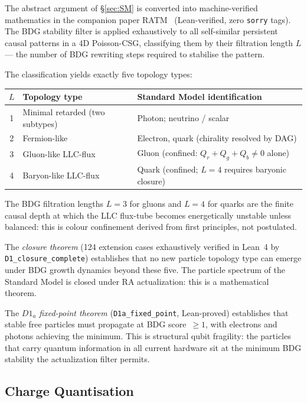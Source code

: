 \documentclass[11pt,a4paper]{article}
\begin{document}
The abstract argument of \S\ref{sec:SM} is converted into machine-verified
mathematics in the companion paper RATM~\citep{Sandeman2026RATM}
(Lean-verified, zero \texttt{sorry} tags). The BDG stability
filter is applied exhaustively to all self-similar persistent causal
patterns in a 4D Poisson-CSG, classifying them by their filtration length
$L$ --- the number of BDG rewriting steps required to stabilise the pattern.

The classification yields exactly five topology types:

\begin{center}
\renewcommand{\arraystretch}{1.25}
\begin{tabular}{cll}
\toprule
$L$ & Topology type & Standard Model identification \\
\midrule
1 & Minimal retarded (two subtypes) & Photon; neutrino / scalar \\
2 & Fermion-like & Electron, quark (chirality resolved by DAG) \\
3 & Gluon-like LLC-flux & Gluon (confined: $Q_r + Q_g + Q_b \neq 0$ alone) \\
4 & Baryon-like LLC-flux & Quark (confined; $L=4$ requires baryonic closure) \\
\bottomrule
\end{tabular}
\end{center}

\noindent
The BDG filtration lengths $L = 3$ for gluons and $L = 4$ for quarks
are the finite causal depth at which the LLC flux-tube becomes energetically
unstable unless balanced: this is colour confinement derived from first
principles, not postulated.

The \emph{closure theorem} (124 extension cases exhaustively verified
in Lean~4 by \texttt{D1\_closure\_complete}) establishes that no new
particle topology type can emerge under BDG growth dynamics beyond these
five. The particle spectrum of the Standard Model is closed under RA
actualization: this is a mathematical theorem.

The \emph{$D1_a$ fixed-point theorem} (\texttt{D1a\_fixed\_point},
Lean-proved) establishes that stable free particles must propagate
at BDG score~$\geq 1$, with electrons and photons achieving the minimum.
This is structural qubit fragility: the particles that carry quantum
information in all current hardware sit at the minimum BDG stability
the actualization filter permits.

\subsection{Charge Quantisation}
\end{document}
